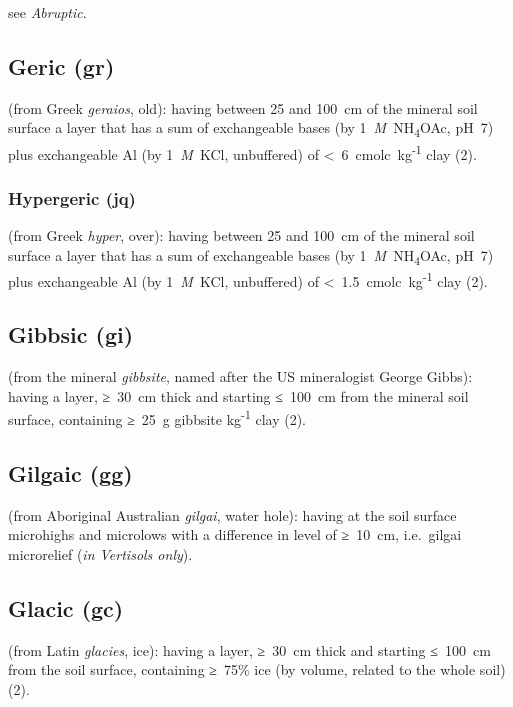 \documentclass[
  letterpaper,
  DIV=11,
  numbers=noendperiod]{scrreprt}
\begin{document}
see \emph{Abruptic}.

\hypertarget{geric-gr}{%
\subsection{Geric (gr)}\label{geric-gr}}

(from Greek \emph{geraios}, old): having between 25 and 100~cm of the
mineral soil surface a layer that has a sum of exchangeable bases (by
1~\emph{M}~NH\textsubscript{4}OAc, pH~7) plus exchangeable Al (by
1~\emph{M}~KCl, unbuffered) of \textless~6~cmolc~kg\textsuperscript{-1}
clay (2).

\hypertarget{hypergeric-jq}{%
\subsubsection{Hypergeric (jq)}\label{hypergeric-jq}}

(from Greek \emph{hyper}, over): having between 25 and 100~cm of the
mineral soil surface a layer that has a sum of exchangeable bases (by
1~\emph{M}~NH\textsubscript{4}OAc, pH~7) plus exchangeable Al (by
1~\emph{M}~KCl, unbuffered) of
\textless~1.5~cmolc~kg\textsuperscript{-1} clay (2).

\hypertarget{gibbsic-gi}{%
\subsection{Gibbsic (gi)}\label{gibbsic-gi}}

(from the mineral \emph{gibbsite}, named after the US mineralogist
George Gibbs): having a layer, ≥~30~cm thick and starting ≤~100~cm from
the mineral soil surface, containing ≥~25~g gibbsite
kg\textsuperscript{-1} clay (2).

\hypertarget{gilgaic-gg}{%
\subsection{Gilgaic (gg)}\label{gilgaic-gg}}

(from Aboriginal Australian \emph{gilgai}, water hole): having at the
soil surface microhighs and microlows with a difference in level of
≥~10~cm, i.e.~gilgai microrelief (\emph{in Vertisols only}).

\hypertarget{glacic-gc}{%
\subsection{Glacic (gc)}\label{glacic-gc}}

(from Latin \emph{glacies}, ice): having a layer, ≥~30~cm thick and
starting ≤~100~cm from the soil surface, containing ≥~75\% ice (by
volume, related to the whole soil) (2).
\end{document}
